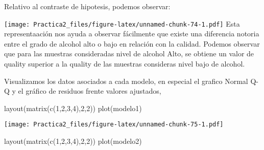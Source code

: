 \documentclass[
]{article}
\newenvironment{Shaded}{\begin{snugshade}}{\end{snugshade}}
\newcommand{\AttributeTok}[1]{\textcolor[rgb]{0.77,0.63,0.00}{#1}}
\newcommand{\DecValTok}[1]{\textcolor[rgb]{0.00,0.00,0.81}{#1}}
\newcommand{\FloatTok}[1]{\textcolor[rgb]{0.00,0.00,0.81}{#1}}
\newcommand{\FunctionTok}[1]{\textcolor[rgb]{0.00,0.00,0.00}{#1}}
\newcommand{\NormalTok}[1]{#1}
\newcommand{\OtherTok}[1]{\textcolor[rgb]{0.56,0.35,0.01}{#1}}
\newcommand{\SpecialCharTok}[1]{\textcolor[rgb]{0.00,0.00,0.00}{#1}}
\newcommand{\StringTok}[1]{\textcolor[rgb]{0.31,0.60,0.02}{#1}}
\begin{document}
Relativo al contraste de hipotesis, podemos observar:

\begin{Shaded}
\end{Shaded}

\texttt{[image: Practica2\_files/figure-latex/unnamed-chunk-74-1.pdf]}
Esta representaación nos ayuda a observar fácilmente que existe una
diferencia notoria entre el grado de alcohol alto o bajo en relación con
la calidad. Podemos observar que para las muestras consideradas nivel de
alcohol Alto, se obtiene un valor de quality superior a la quality de
las muestras consideras nivel bajo de alcohol.

Visualizamos los datos asociados a cada modelo, en especial el grafico
Normal Q-Q y el gráfico de residuos frente valores ajustados,

\begin{Shaded}
\begin{Highlighting}[]
\FunctionTok{layout}\NormalTok{(}\FunctionTok{matrix}\NormalTok{(}\FunctionTok{c}\NormalTok{(}\DecValTok{1}\NormalTok{,}\DecValTok{2}\NormalTok{,}\DecValTok{3}\NormalTok{,}\DecValTok{4}\NormalTok{),}\DecValTok{2}\NormalTok{,}\DecValTok{2}\NormalTok{))}
\FunctionTok{plot}\NormalTok{(modelo1)}
\end{Highlighting}
\end{Shaded}

\texttt{[image: Practica2\_files/figure-latex/unnamed-chunk-75-1.pdf]}

\begin{Shaded}
\begin{Highlighting}[]
\FunctionTok{layout}\NormalTok{(}\FunctionTok{matrix}\NormalTok{(}\FunctionTok{c}\NormalTok{(}\DecValTok{1}\NormalTok{,}\DecValTok{2}\NormalTok{,}\DecValTok{3}\NormalTok{,}\DecValTok{4}\NormalTok{),}\DecValTok{2}\NormalTok{,}\DecValTok{2}\NormalTok{))}
\FunctionTok{plot}\NormalTok{(modelo2)}
\end{Highlighting}
\end{Shaded}
\end{document}
